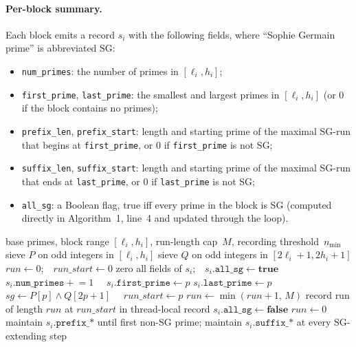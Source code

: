 \documentclass[11pt,a4paper]{article}
\theoremstyle{definition}
\begin{document}
\paragraph{Per-block summary.} Each block emits a record $s_i$ with
the following fields, where ``Sophie Germain prime'' is abbreviated SG:
\begin{itemize}
\item \texttt{num\_primes}: the number of primes in $[\ell_i, h_i]$;
\item \texttt{first\_prime}, \texttt{last\_prime}: the smallest and
largest primes in $[\ell_i, h_i]$ (or $0$ if the block contains no
primes);
\item \texttt{prefix\_len}, \texttt{prefix\_start}: length and starting
prime of the maximal SG-run that begins at \texttt{first\_prime}, or $0$
if \texttt{first\_prime} is not SG;
\item \texttt{suffix\_len}, \texttt{suffix\_start}: length and starting
prime of the maximal SG-run that ends at \texttt{last\_prime}, or $0$
if \texttt{last\_prime} is not SG;
\item \texttt{all\_sg}: a Boolean flag, true iff every prime in the
block is SG (computed directly in Algorithm~1, line~4 and updated
through the loop).
\end{itemize}

\begin{algorithm}[ht]
\caption{Per-block scan (executed once per block, in parallel)}
\begin{algorithmic}[1]
\Require base primes, block range $[\ell_i, h_i]$, run-length cap~$M$,
recording threshold~$n_{\min}$
\State sieve $P$ on odd integers in $[\ell_i, h_i]$
\State sieve $Q$ on odd integers in $[2\ell_i+1, 2h_i+1]$
\State $\textit{run} \gets 0$;\ \ $\textit{run\_start} \gets 0$
\State zero all fields of $s_i$;\ \ $s_i.\texttt{all\_sg} \gets \textbf{true}$
  \State $s_i.\texttt{num\_primes} \mathrel{+}= 1$
  \ \ $s_i.\texttt{first\_prime} \gets p$\EndIf
  \State $s_i.\texttt{last\_prime} \gets p$
  \State $\textit{sg} \gets P[p] \wedge Q[2p+1]$
    \ \ $\textit{run\_start} \gets p$\EndIf
    \State $\textit{run} \gets \min(\textit{run}+1,\,M)$
      \State record run of length $\textit{run}$ at $\textit{run\_start}$ in thread-local record
    \EndIf
  \Else
    \State $s_i.\texttt{all\_sg} \gets \textbf{false}$
    \State $\textit{run} \gets 0$
  \EndIf
  \State maintain $s_i.\texttt{prefix\_*}$ until first non-SG prime; maintain $s_i.\texttt{suffix\_*}$ at every SG-extending step
\EndFor
\end{algorithmic}
\end{algorithm}
\end{document}
